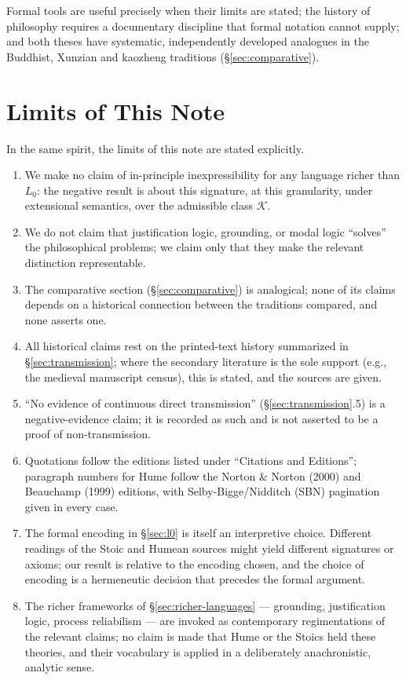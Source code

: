 \documentclass[11pt]{article}
\theoremstyle{plain}
\theoremstyle{definition}
\theoremstyle{remark}
\begin{document}
Formal tools are useful precisely when their limits are stated; the
history of philosophy requires a documentary discipline that formal
notation cannot supply; and both theses have systematic, independently
developed analogues in the Buddhist, Xunzian and kaozheng traditions
(\S\ref{sec:comparative}).

\section{Limits of This Note}
\label{sec:limits}

In the same spirit, the limits of this note are stated explicitly.

\begin{enumerate}
\item We make no claim of in-principle inexpressibility for any
language richer than $L_0$: the negative result is about this
signature, at this granularity, under extensional semantics, over the
admissible class $\mathcal K$.
\item We do not claim that justification logic, grounding, or modal
logic ``solves'' the philosophical problems; we claim only that they
make the relevant distinction representable.
\item The comparative section (\S\ref{sec:comparative}) is analogical;
none of its claims depends on a historical connection between the
traditions compared, and none asserts one.
\item All historical claims rest on the printed-text history summarized
in \S\ref{sec:transmission}; where the secondary literature is the sole
support (e.g., the medieval manuscript census), this is stated, and the
sources are given.
\item ``No evidence of continuous direct transmission''
(\S\ref{sec:transmission}.5) is a negative-evidence claim; it is
recorded as such and is not asserted to be a proof of non-transmission.
\item Quotations follow the editions listed under ``Citations and
Editions''; paragraph numbers for Hume follow the Norton \& Norton
(2000) and Beauchamp (1999) editions, with Selby-Bigge/Nidditch (SBN)
pagination given in every case.
\item The formal encoding in \S\ref{sec:l0} is itself an interpretive
choice. Different readings of the Stoic and Humean sources might yield
different signatures or axioms; our result is relative to the encoding
chosen, and the choice of encoding is a hermeneutic decision that
precedes the formal argument.
\item The richer frameworks of \S\ref{sec:richer-languages} ---
grounding, justification logic, process reliabilism --- are invoked as
contemporary regimentations of the relevant claims; no claim is made
that Hume or the Stoics held these theories, and their vocabulary is
applied in a deliberately anachronistic, analytic sense.
\end{enumerate}
\end{document}

